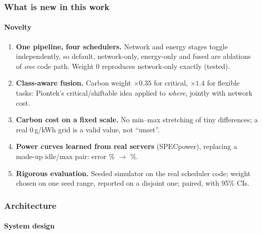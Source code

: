 \documentclass[aspectratio=169,11pt]{beamer}
\begin{document}
\begin{frame}[t]
\frametitle{What is new in this work}
\framesubtitle{Novelty}
\setlength{\itemsep}{3pt}
\begin{enumerate}\small
\item[\textcolor{okorange}{\textbf{1}}] \textbf{One pipeline, four schedulers.} Network and energy stages toggle independently, so default, network-only, energy-only and fused are ablations of \emph{one} code path. Weight 0 reproduces network-only exactly (tested).
\item[\textcolor{okorange}{\textbf{2}}] \textbf{Class-aware fusion.} Carbon weight $\times0.35$ for critical, $\times1.4$ for flexible tasks: Piontek's critical/shiftable idea applied to \emph{where}, jointly with network cost.
\item[\textcolor{okorange}{\textbf{3}}] \textbf{Carbon cost on a fixed scale.} No min--max stretching of tiny differences; a real $0$\,g/kWh grid is a valid value, not ``unset''.
\item[\textcolor{okorange}{\textbf{4}}] \textbf{Power curves learned from \NSystemsKept{} real servers} (SPECpower), replacing a made-up idle/max pair: error \MapePlaceholder\% $\to$ \MapeXgb\%.
\item[\textcolor{okorange}{\textbf{5}}] \textbf{Rigorous evaluation.} Seeded simulator on the real scheduler code; weight chosen on one seed range, reported on a disjoint one; paired, with 95\% CIs.
\end{enumerate}
\end{frame}

\begin{frame}[t]
\frametitle{Architecture}
\framesubtitle{System design}
\begin{center}
\resizebox{!}{5.55cm}{}
\end{center}
\end{frame}
\end{document}
